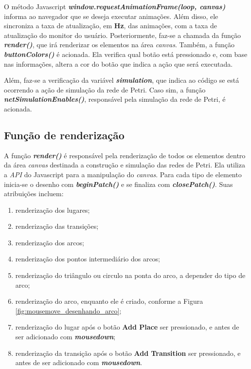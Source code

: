 \documentclass[
	12pt,				%
	openright,			%
	oneside,			%
	a4paper,			%
	english,			%
	brazil				%
	]{abntex2}
\theoremstyle{doispontos}
\begin{document}
O método Javascript \textbf{\textit{window.requestAnimationFrame(loop, canvas)}} informa ao navegador que se deseja executar animações. Além disso, ele sincroniza a taxa de atualização, em \textbf{Hz}, das animações, com a taxa de atualização do monitor do usuário. Posteriormente, faz-se a chamada da função \textbf{\textit{render()}}, que irá renderizar os elementos na área \textit{canvas}. Também, a função \textbf{\textit{buttonColors()}} é acionada. Ela verifica qual botão está pressionado e, com base nas informações, altera a cor do botão que indica a ação que será executada. 

Além, faz-se a verificação da variável \textbf{\textit{simulation}}, que indica ao código se está ocorrendo a ação de simulação da rede de Petri. Caso sim, a função \textbf{\textit{netSimulationEnables()}}, responsável pela simulação da rede de Petri, é acionada.

\subsection{Função de renderização}

A função \textbf{\textit{render()}} é responsável pela renderização de todos os elementos dentro da área \textit{canvas} destinada a construção e simulação das redes de Petri. Ela utiliza a \textit{API} do Javascript para a manipulação do \textit{canvas}. Para cada tipo de elemento inicia-se o desenho com \textbf{\textit{beginPatch()}} e se finaliza com \textbf{\textit{closePatch()}}. Suas atribuições incluem:

\begin{enumerate}
	\item renderização dos lugares;
	\item renderização das transições;
	\item renderização dos arcos;
	\item renderização dos pontos intermediário dos arcos;
	\item renderização do triângulo ou circulo na ponta do arco, a depender do tipo de arco;
	\item renderização do arco, enquanto ele é criado, conforme a Figura \ref{fig:mousemove_desenhando_arco};
	\item renderização do lugar após o botão \textbf{Add Place} ser pressionado, e antes de ser adicionado com \textbf{\textit{mousedown}};
	\item renderização da transição após o botão \textbf{Add Transition} ser pressionado, e antes de ser adicionado com \textbf{\textit{mousedown}}.
\end{enumerate}
\end{document}
